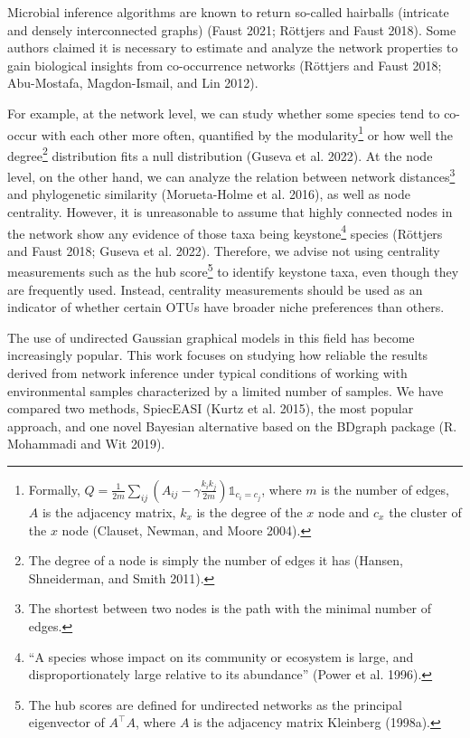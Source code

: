 \documentclass[
  a4paper,
]{article}
\begin{document}
Microbial inference algorithms are known to return so-called hairballs
(intricate and densely interconnected graphs) (Faust 2021; Röttjers and
Faust 2018). Some authors claimed it is necessary to estimate and
analyze the network properties to gain biological insights from
co-occurrence networks (Röttjers and Faust 2018; Abu-Mostafa,
Magdon-Ismail, and Lin 2012).

For example, at the network level, we can study whether some species
tend to co-occur with each other more often, quantified by the
modularity\footnote{Formally,
  \(Q = \frac{1}{2m}\sum_{ij}\left( A_{ij} - \gamma \frac{k_ik_j}{2m}\right )\mathbb1_{c_i = c_j}\),
  where \(m\) is the number of edges, \(A\) is the adjacency matrix,
  \(k_x\) is the degree of the \(x\) node and \(c_x\) the cluster of the
  \(x\) node (Clauset, Newman, and Moore 2004).} or how well the
degree\footnote{The degree of a node is simply the number of edges it
  has (Hansen, Shneiderman, and Smith 2011).} distribution fits a null
distribution (Guseva et al. 2022). At the node level, on the other hand,
we can analyze the relation between network distances\footnote{The
  shortest between two nodes is the path with the minimal number of
  edges.} and phylogenetic similarity (Morueta-Holme et al. 2016), as
well as node centrality. However, it is unreasonable to assume that
highly connected nodes in the network show any evidence of those taxa
being keystone\footnote{``A species whose impact on its community or
  ecosystem is large, and disproportionately large relative to its
  abundance'' (Power et al. 1996).} species (Röttjers and Faust 2018;
Guseva et al. 2022). Therefore, we advise not using centrality
measurements such as the hub score\footnote{The hub scores are defined
  for undirected networks as the principal eigenvector of \(A^\top A\),
  where \(A\) is the adjacency matrix Kleinberg (1998a).} to identify
keystone taxa, even though they are frequently used. Instead, centrality
measurements should be used as an indicator of whether certain OTUs have
broader niche preferences than others.

The use of undirected Gaussian graphical models in this field has become
increasingly popular. This work focuses on studying how reliable the
results derived from network inference under typical conditions of
working with environmental samples characterized by a limited number of
samples. We have compared two methods, SpiecEASI (Kurtz et al. 2015),
the most popular approach, and one novel Bayesian alternative based on
the BDgraph package (R. Mohammadi and Wit 2019).
\end{document}
